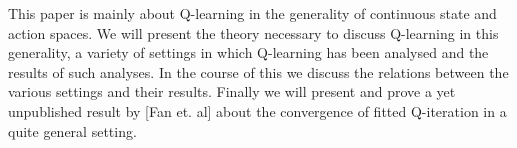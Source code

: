 
This paper is mainly about Q-learning in the generality of continuous state
and action spaces.
We will present the theory necessary to discuss Q-learning in this generality,
a variety of settings in which Q-learning has been analysed
and the results of such analyses.
In the course of this we discuss the relations between the various settings
and their results.
Finally we will present and prove a yet unpublished result by
[Fan et. al]
about the convergence of fitted Q-iteration in a quite general
setting.

